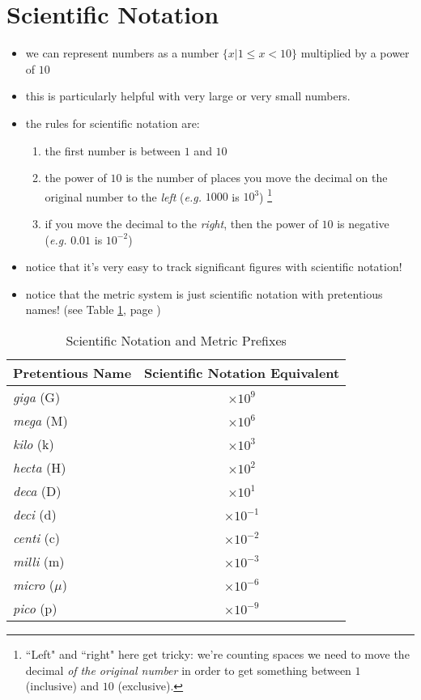 \documentclass[11pt, oneside]{article}   	%
\begin{document}
\section{Scientific Notation}
\begin{itemize}
\item we can represent numbers as a number $\{ x | 1 \leq x < 10 \}$ multiplied by a power of $10$
\item this is particularly helpful with very large or very small numbers.
\item the rules for scientific notation are:
\begin{enumerate}
\item the first number is between $ 1 $ and $ 10 $
\item  the power of $ 10 $ is the number of places you move the decimal on the original number to the \emph{left} (\emph{e.g.} $1000$ is $10^{3}$)
\footnote{``Left" and ``right" here get tricky: we're counting spaces we need to move the decimal \emph{of the original number} in order to get something between $1$ (inclusive) and $10$ (exclusive).}
\item if you move the decimal to the \emph{right}, then the power of $ 10 $ is negative (\emph{e.g.} $0.01$ is $10^{-2}$)
\end{enumerate}
\item notice that it's very easy to track significant figures with scientific notation!
\item notice that the metric system is just scientific notation with pretentious names! (see Table \ref{table:pretentiousprefixes}, page \pageref{table:pretentiousprefixes})
 \end{itemize}

\begin{table}
\centering
\begin{tabular}[c]{l|c}
\hline
Pretentious Name & Scientific Notation Equivalent \\
\hline
\emph{giga} (G)  & $ \times 10^{9} $   \\
\emph{mega} (M)  & $ \times 10^{6} $   \\
\emph{kilo} (k)      & $ \times 10^{3} $   \\
\emph{hecta} (H)      & $ \times 10^{2} $   \\
\emph{deca} (D)      & $ \times 10^{1} $   \\
\emph{deci} (d)      & $ \times 10^{-1} $   \\
\emph{centi} (c)     & $ \times 10^{-2} $   \\
\emph{milli}  (m)    & $ \times 10^{-3} $  \\
\emph{micro} ($\mu$)  & $ \times 10^{-6} $  \\
\emph{pico}  (p) & $ \times 10^{-9} $  \\
\end{tabular}
\caption{Scientific Notation and Metric Prefixes}
\label{table:pretentiousprefixes}
\end{table}
\end{document}
